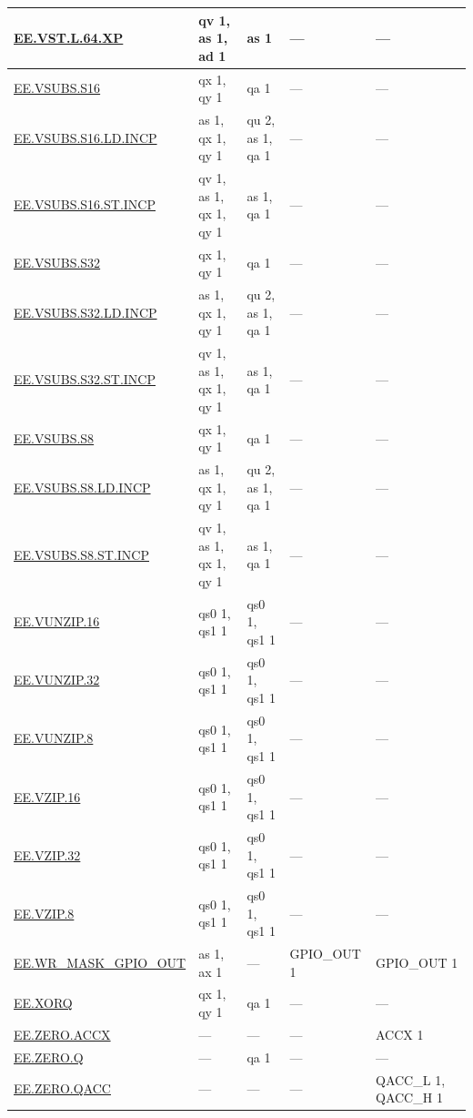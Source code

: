 \begin{longtable}[c]{|l|m{2.5cm}|m{2.5cm}|m{2.5cm}|m{2.5cm}|}
    \hyperref[instruction:EEVSTL64XP]{EE.VST.L.64.XP} & qv 1, as 1, ad 1 & as 1 & — & — \\\hline
    \hyperref[instruction:EEVSUBSS16]{EE.VSUBS.S16} & qx 1, qy 1 & qa 1 & — & — \\\hline
    \hyperref[instruction:EEVSUBSS16LDINCP]{EE.VSUBS.S16.LD.INCP} & as 1, qx 1, qy 1 & qu 2, as 1, qa 1 & — & — \\\hline
    \hyperref[instruction:EEVSUBSS16STINCP]{EE.VSUBS.S16.ST.INCP} & qv 1, as 1, qx 1, qy 1 & as 1, qa 1 & — & — \\\hline
    \hyperref[instruction:EEVSUBSS32]{EE.VSUBS.S32} & qx 1, qy 1 & qa 1 & — & — \\\hline
    \hyperref[instruction:EEVSUBSS32LDINCP]{EE.VSUBS.S32.LD.INCP} & as 1, qx 1, qy 1 & qu 2, as 1, qa 1 & — & — \\\hline
    \hyperref[instruction:EEVSUBSS32STINCP]{EE.VSUBS.S32.ST.INCP} & qv 1, as 1, qx 1, qy 1 & as 1, qa 1 & — & — \\\hline
    \hyperref[instruction:EEVSUBSS8]{EE.VSUBS.S8} & qx 1, qy 1 & qa 1 & — & — \\\hline
    \hyperref[instruction:EEVSUBSS8LDINCP]{EE.VSUBS.S8.LD.INCP} & as 1, qx 1, qy 1 & qu 2, as 1, qa 1 & — & — \\\hline
    \hyperref[instruction:EEVSUBSS8STINCP]{EE.VSUBS.S8.ST.INCP} & qv 1, as 1, qx 1, qy 1 & as 1, qa 1 & — & — \\\hline
    \hyperref[instruction:EEVUNZIP16]{EE.VUNZIP.16} & qs0 1, qs1 1 & qs0 1, qs1 1 & — & — \\\hline
    \hyperref[instruction:EEVUNZIP32]{EE.VUNZIP.32} & qs0 1, qs1 1 & qs0 1, qs1 1 & — & — \\\hline
    \hyperref[instruction:EEVUNZIP8]{EE.VUNZIP.8} & qs0 1, qs1 1 & qs0 1, qs1 1 & — & — \\\hline
    \hyperref[instruction:EEVZIP16]{EE.VZIP.16} & qs0 1, qs1 1 & qs0 1, qs1 1 & — & — \\\hline
    \hyperref[instruction:EEVZIP32]{EE.VZIP.32} & qs0 1, qs1 1 & qs0 1, qs1 1 & — & — \\\hline
    \hyperref[instruction:EEVZIP8]{EE.VZIP.8} & qs0 1, qs1 1 & qs0 1, qs1 1 & — & — \\\hline
    \hyperref[instruction:EEWRMASKGPIOOUT]{EE.WR\_MASK\_GPIO\_OUT} & as 1, ax 1 & — & GPIO\_OUT 1 & GPIO\_OUT 1 \\\hline
    \hyperref[instruction:EEXORQ]{EE.XORQ} & qx 1, qy 1 & qa 1 & — & — \\\hline
    \hyperref[instruction:EEZEROACCX]{EE.ZERO.ACCX} & — & — & — & ACCX 1\\\hline
    \hyperref[instruction:EEZEROQ]{EE.ZERO.Q} & — & qa 1 & — & — \\\hline
    \hyperref[instruction:EEZEROQACC]{EE.ZERO.QACC} & — & — & — & QACC\_L 1, QACC\_H 1\\\hline
\end{longtable}